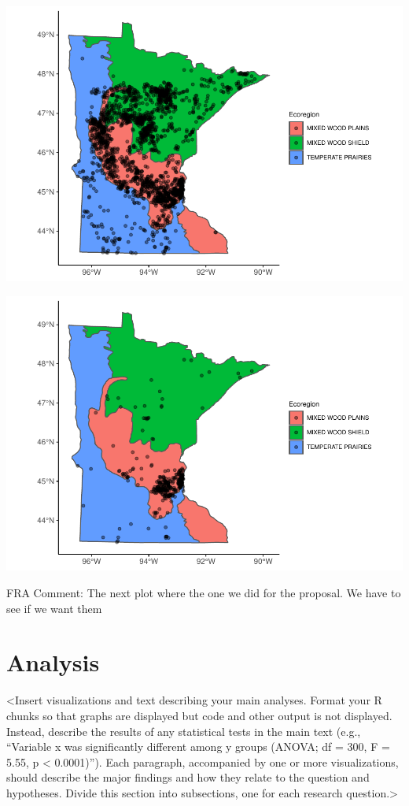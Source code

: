 \documentclass[12pt,]{article}
\begin{document}
\includegraphics{Bollt_Greif_Raby_Roth_Draft_1115_files/figure-latex/summary.for.prime.season-1.pdf}

\includegraphics{Bollt_Greif_Raby_Roth_Draft_1115_files/figure-latex/summary.for.late.season-1.pdf}

FRA Comment: The next plot where the one we did for the proposal. We
have to see if we want them

\newpage

\hypertarget{analysis}{%
\section{Analysis}\label{analysis}}

\textless Insert visualizations and text describing your main analyses.
Format your R chunks so that graphs are displayed but code and other
output is not displayed. Instead, describe the results of any
statistical tests in the main text (e.g., ``Variable x was significantly
different among y groups (ANOVA; df = 300, F = 5.55, p \textless{}
0.0001)''). Each paragraph, accompanied by one or more visualizations,
should describe the major findings and how they relate to the question
and hypotheses. Divide this section into subsections, one for each
research question.\textgreater{}
\end{document}
